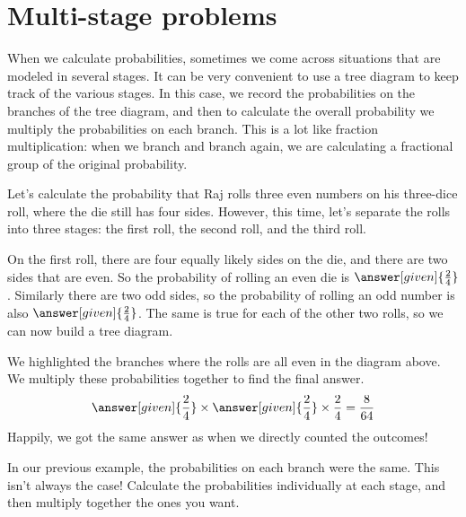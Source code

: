 \documentclass{ximera}
\begin{document}
\section{Multi-stage problems}
When we calculate probabilities, sometimes we come across situations that are modeled in several stages. It can be very convenient to use a tree diagram to keep track of the various stages. In this case, we record the probabilities on the branches of the tree diagram, and then to calculate the overall probability we multiply the probabilities on each branch. This is a lot like fraction multiplication: when we branch and branch again, we are calculating a fractional group of the original probability. 

\begin{example}
Let's calculate the probability that Raj rolls three even numbers on his three-dice roll, where the die still has four sides. However, this time, let's separate the rolls into three stages: the first roll, the second roll, and the third roll. 

On the first roll, there are four equally likely sides on the die, and there are two sides that are even. So the probability of rolling an even die is $\answer[given]{\frac{2}{4}}$. Similarly there are two odd sides, so the probability of rolling an odd number is also $\answer[given]{\frac{2}{4}}$. The same is true for each of the other two rolls, so we can now build a tree diagram.
\begin{image}
\end{image}
We highlighted the branches where the rolls are all even in the diagram above. We multiply these probabilities together to find the final answer.
\[
\answer[given]{\frac{2}{4}} \times \answer[given]{\frac{2}{4}} \times \frac{2}{4} = \frac{8}{64}
\]
Happily, we got the same answer as when we directly counted the outcomes!



\end{example}
In our previous example, the probabilities on each branch were the same. This isn't always the case! Calculate the probabilities individually at each stage, and then multiply together the ones you want.
\end{document}
